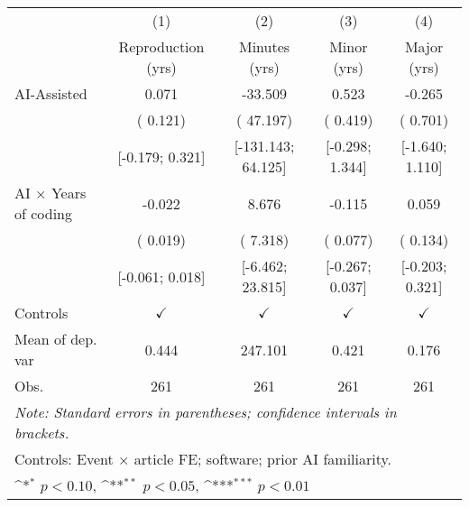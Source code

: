 \def\sym#1{\ifmmode^{#1}\else\(^{#1}\)\fi}
\begin{tabular}{l*{4}{c}}
\hline\hline
 & (1) & (2) & (3) & (4)
\\
 & Reproduction (yrs) & Minutes (yrs) & Minor (yrs) & Major (yrs)
 \\
\hline
AI-Assisted &  0.071 & -33.509 &  0.523 & -0.265
\\
 & ( 0.121) & ( 47.197) & ( 0.419) & ( 0.701)
\\
 & [-0.179;  0.321] & [-131.143;  64.125] & [-0.298;  1.344] & [-1.640;  1.110]
\\
AI × Years of coding & -0.022 &  8.676 & -0.115 &  0.059
\\
 & ( 0.019) & ( 7.318) & ( 0.077) & ( 0.134)
\\
 & [-0.061;  0.018] & [-6.462;  23.815] & [-0.267;  0.037] & [-0.203;  0.321]
\\
\hline
Controls & $\checkmark$ & $\checkmark$ & $\checkmark$ & $\checkmark$
\\
Mean of dep. var &  0.444 &  247.101 &  0.421 &  0.176
\\
Obs. & 261 & 261 & 261 & 261
\\
\hline
\hline\hline
\multicolumn{5}{l}{\it{Note:} Standard errors in parentheses; confidence intervals in brackets.}\\
\multicolumn{5}{l}{Controls: Event $\times$ article FE; software; prior AI familiarity.}\\
\multicolumn{5}{l}{\sym{*} $p<0.10$, \sym{**} $p<0.05$,  \sym{***} $p<0.01$}\\
\end{tabular}
